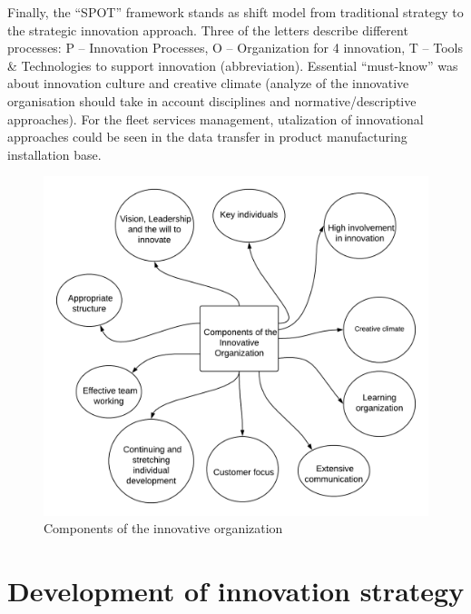 \documentclass[12pt,twoside]{reedthesis}
\begin{document}
Finally, the ``SPOT'' framework stands as shift model from traditional strategy to the strategic innovation approach. Three of the letters describe different processes: P -- Innovation Processes, O -- Organization for
4 innovation, T -- Tools \& Technologies to support innovation (abbreviation). Essential ``must-know'' was about innovation culture and creative climate (analyze of the innovative organisation should take in account disciplines and normative/descriptive approaches). For the fleet services management, utalization of innovational approaches could be seen in the data transfer in product manufacturing installation base.
\begin{figure}[h]

{\centering \includegraphics[width=0.8\linewidth,]{figure/2} 

}

\caption{Components of the innovative organization}\label{fig:components}
\end{figure}
\hypertarget{development-of-innovation-strategy}{%
\section{Development of innovation strategy}\label{development-of-innovation-strategy}}
\end{document}
